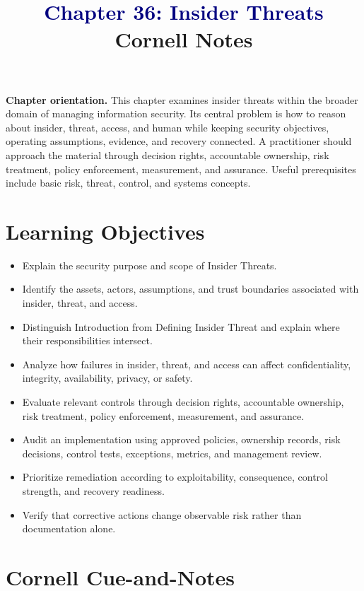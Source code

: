 \documentclass[11pt]{article}
\title{\textcolor{Navy}{Chapter 36: Insider Threats}\\[2mm]\large Cornell Notes}
\author{}
\date{}
\begin{document}
\maketitle
\thispagestyle{fancy}
\vspace{-1.5em}
\begin{orientationbox}
\textbf{Chapter orientation.} This chapter examines insider threats within the broader domain of managing information security. Its central problem is how to reason about insider, threat, access, and human while keeping security objectives, operating assumptions, evidence, and recovery connected. A practitioner should approach the material through decision rights, accountable ownership, risk treatment, policy enforcement, measurement, and assurance. Useful prerequisites include basic risk, threat, control, and systems concepts.
\end{orientationbox}
\section*{Learning Objectives}
\begin{itemize}
\item Explain the security purpose and scope of Insider Threats.
\item Identify the assets, actors, assumptions, and trust boundaries associated with insider, threat, and access.
\item Distinguish Introduction from Defining Insider Threat and explain where their responsibilities intersect.
\item Analyze how failures in insider, threat, and access can affect confidentiality, integrity, availability, privacy, or safety.
\item Evaluate relevant controls through decision rights, accountable ownership, risk treatment, policy enforcement, measurement, and assurance.
\item Audit an implementation using approved policies, ownership records, risk decisions, control tests, exceptions, metrics, and management review.
\item Prioritize remediation according to exploitability, consequence, control strength, and recovery readiness.
\item Verify that corrective actions change observable risk rather than documentation alone.
\end{itemize}
\section*{Cornell Cue-and-Notes}
\end{document}
